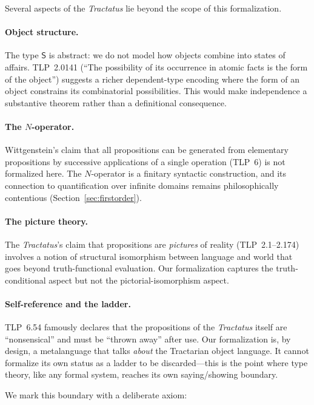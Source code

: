 \documentclass[10pt, letterpaper]{article}
\theoremstyle{definition}
\theoremstyle{remark}
\newcommand{\Sach}{\mathsf{S}}
\begin{document}
Several aspects of the \emph{Tractatus} lie beyond the scope of
this formalization.

\paragraph{Object structure.}
The type $\Sach$ is abstract: we do not model how objects combine
into states of affairs.  TLP~2.0141 (``The possibility of its
occurrence in atomic facts is the form of the object'') suggests
a richer dependent-type encoding where the form of an object
constrains its combinatorial possibilities.  This would make
independence a substantive theorem rather than a definitional
consequence.

\paragraph{The $N$-operator.}
Wittgenstein's claim that all propositions can be generated from
elementary propositions by successive applications of a single
operation (TLP~6) is not formalized here.  The $N$-operator is
a finitary syntactic construction, and its connection to
quantification over infinite domains remains philosophically
contentious (Section~\ref{sec:firstorder}).

\paragraph{The picture theory.}
The \emph{Tractatus}'s claim that propositions are
\emph{pictures} of reality (TLP~2.1--2.174) involves a notion
of structural isomorphism between language and world that goes
beyond truth-functional evaluation.  Our formalization captures
the truth-conditional aspect but not the pictorial-isomorphism
aspect.

\paragraph{Self-reference and the ladder.}
TLP~6.54 famously declares that the propositions of the
\emph{Tractatus} itself are ``nonsensical'' and must be ``thrown
away'' after use.  Our formalization is, by design, a
metalanguage that talks \emph{about} the Tractarian object
language.  It cannot formalize its own status as a ladder to be
discarded---this is the point where type theory, like any formal
system, reaches its own saying/showing boundary.

We mark this boundary with a deliberate axiom:
\end{document}
